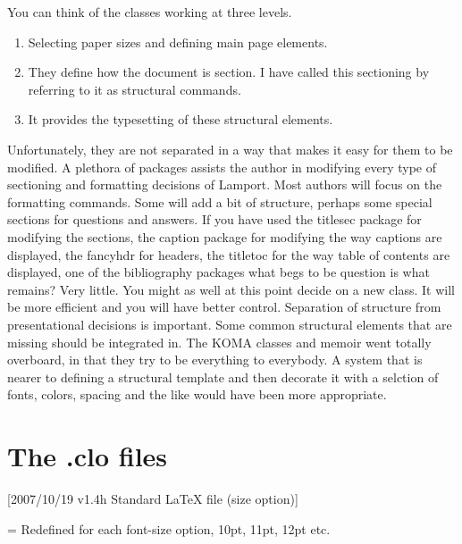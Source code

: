 You can think of the \latex classes working at three levels. 

\begin{enumerate}
\item Selecting paper sizes and defining main page elements.
\item They define how the document is section. I have called this sectioning by referring to it as structural commands.
\item It provides the typesetting of these structural elements.
\end{enumerate}

Unfortunately, they are not separated in a way that makes it easy for them to be modified. A plethora of packages assists the author in modifying every type of sectioning and formatting decisions of Lamport. Most authors will focus on the formatting commands. Some will add a bit of structure, perhaps some special sections for questions and answers. If you have used the titlesec package for modifying the sections, the caption package for modifying the way captions are displayed, the fancyhdr for headers, the titletoc for the way table of contents are displayed, one of the bibliography packages what begs to be question is what remains? Very little. You might as well at this point decide on a new class. It will be more efficient and you will have better control. Separation of structure from presentational decisions is important. Some common structural elements that are missing should be integrated in. The KOMA classes and memoir went totally overboard, in that they try to be everything to everybody. A system that is nearer to defining a structural template and then decorate it with a selction of fonts, colors, spacing and the like would have been more appropriate.

\section{The .clo files}
\label{sec:clo}
\begin{teX}

              [2007/10/19 v1.4h
      Standard LaTeX file (size option)]
\end{teX}

\noindent{} { = }
Redefined for each font-size option, 10pt, 11pt, 12pt etc.

